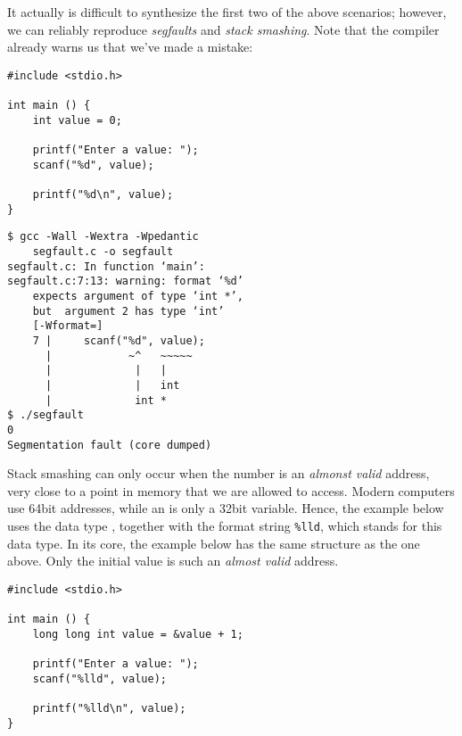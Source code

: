 It actually is difficult to synthesize the first two of the above scenarios; however, we can reliably reproduce \emph{segfaults} and \emph{stack smashing}. Note that the compiler already warns us that we've made a mistake:
\begin{tcbraster}[raster columns=2,
                  raster equal height,
                  nobeforeafter,
                  raster column skip=0.2cm]
\begin{warnbox}[segfault.c, leftupper=7mm]
\begin{verbatim}
#include <stdio.h>

int main () {
    int value = 0;
    
    printf("Enter a value: "); 
    scanf("%d", value);
    
    printf("%d\n", value);
}
\end{verbatim}
\end{warnbox}
%
\begin{cmdbox}
\begin{verbatim}
$ gcc -Wall -Wextra -Wpedantic 
    segfault.c -o segfault
segfault.c: In function ‘main’:
segfault.c:7:13: warning: format ‘%d’ 
    expects argument of type ‘int *’,
    but  argument 2 has type ‘int’ 
    [-Wformat=]
    7 |     scanf("%d", value);
      |            ~^   ~~~~~
      |             |   |
      |             |   int
      |             int *
$ ./segfault
0
Segmentation fault (core dumped)
\end{verbatim}
\end{cmdbox}
\end{tcbraster}

\vfill
Stack smashing can only occur when the number is an \emph{almonst valid} address, \ie very close to a point in memory that we are allowed to access. Modern computers use 64bit addresses, while an  is only a 32bit variable. Hence, the example below uses the data type , together with the format string \texttt{\%lld}, which stands for this data type. In its core, the example below has the same structure as the one above. Only the initial value is such an \emph{almost valid} address.

\begin{warnbox}[stackSmashing.c, leftupper=7mm]
\begin{verbatim}
#include <stdio.h>

int main () {
    long long int value = &value + 1;
    
    printf("Enter a value: ");
    scanf("%lld", value);
    
    printf("%lld\n", value);
}
\end{verbatim}
\end{warnbox}

